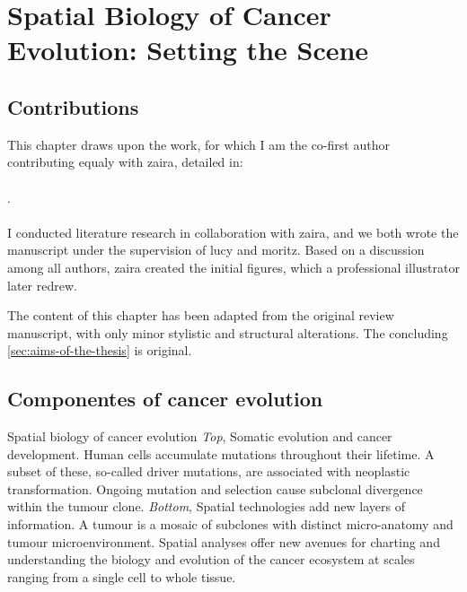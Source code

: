 \chapter{Spatial Biology of Cancer Evolution: Setting the Scene}
\label{sec:chapter-introduction}

\section*{Contributions}

This chapter draws upon the work, for which I am the co-first author contributing equaly with \ac{zaira}, detailed in:
\\~\\
.
\\~\\
I conducted literature research in collaboration with \ac{zaira}, and we both wrote the manuscript under the supervision of \ac{lucy} and \ac{moritz}. Based on a discussion among all authors, \ac{zaira} created the initial figures, which a professional illustrator later redrew.

The content of this chapter has been adapted from the original review manuscript, with only minor stylistic and structural alterations. The concluding \cref{sec:aims-of-the-thesis} is original.

\section{Componentes of cancer evolution}

    {Spatial biology of cancer evolution \parencite{Seferbekova2023-wg}}
    {\emph{Top}, Somatic evolution and cancer development. Human cells accumulate mutations throughout their lifetime. A subset of these, so-called driver mutations, are associated with neoplastic transformation. Ongoing mutation and selection cause subclonal divergence within the tumour clone. \emph{Bottom}, Spatial technologies add new layers of information. A tumour is a mosaic of subclones with distinct micro-anatomy and tumour microenvironment. Spatial analyses offer new avenues for charting and understanding the biology and evolution of the cancer ecosystem at scales ranging from a single cell to whole tissue.}


